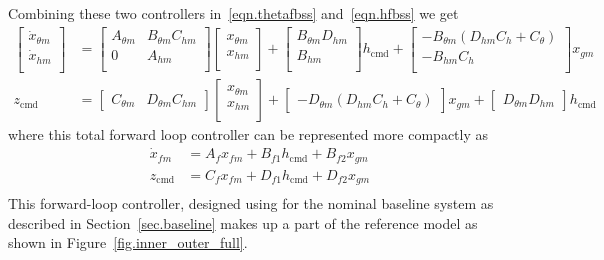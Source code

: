 \documentclass[]{../sty/aiaa-tc}
\theoremstyle{examplestyle}
\begin{document}
  Combining these two controllers in\ \eqref{eqn.thetafbss} and\ \eqref{eqn.hfbss} we get
  \begin{equation*}
    \begin{split}
      \begin{bmatrix}
        \dot{x}_{\theta m} \\
        \dot{x}_{hm} \\
      \end{bmatrix}
      &=
      \begin{bmatrix}
        A_{\theta m} & B_{\theta m}C_{hm} \\
        0 & A_{hm} \\
      \end{bmatrix}
      \begin{bmatrix}
        x_{\theta m} \\
        x_{hm} \\
      \end{bmatrix}
      +
      \begin{bmatrix}
        B_{\theta m}D_{hm} \\
        B_{hm} \\
      \end{bmatrix}
      h_{\text{cmd}}
      +
      \begin{bmatrix}
        - B_{\theta m}(D_{hm}C_{h} + C_{\theta}) \\
        - B_{hm}C_{h} \\
      \end{bmatrix}
      x_{gm} \\
      z_{\text{cmd}}
      &=
      \begin{bmatrix}
        C_{\theta m} & D_{\theta m}C_{hm}
      \end{bmatrix}
      \begin{bmatrix}
        x_{\theta m} \\
        x_{hm} \\
      \end{bmatrix}
      +
      \begin{bmatrix}
        - D_{\theta m}(D_{hm}C_{h} + C_{\theta})
      \end{bmatrix}
      x_{gm}
      +
      \begin{bmatrix}
        D_{\theta m}D_{hm}
      \end{bmatrix}
      h_{\text{cmd}}
    \end{split}
  \end{equation*}
  where this total forward loop controller can be represented more compactly as
  \begin{equation}
    \label{eqn.controllerss}
    \begin{split}
      \dot{x}_{fm} &= A_{f}x_{fm} + B_{f1}h_{\text{cmd}} + B_{f2}x_{gm} \\
      z_{\text{cmd}} &= C_{f}x_{fm} + D_{f1}h_{\text{cmd}} + D_{f2}x_{gm} \\
    \end{split}
  \end{equation}
  This forward-loop controller, designed using for the nominal baseline system as described in Section~\ref{sec.baseline} makes up a part of the reference model as shown in Figure~\ref{fig.inner_outer_full}.
\end{document}
